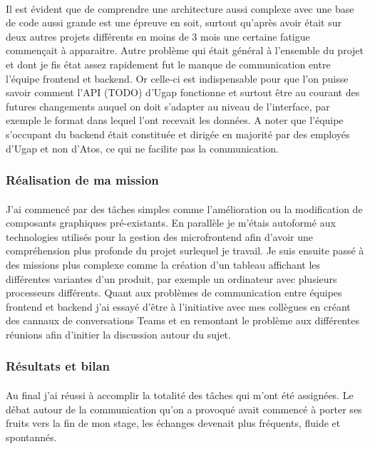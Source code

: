 \documentclass[12pt]{article}
\begin{document}
\begin {sloppypar}
\paragraph{}
Il est évident que de comprendre une architecture aussi complexe avec une base de code aussi grande 
est une épreuve en soit, surtout qu'après avoir était sur deux autres projets différents en moins de 3 mois
une certaine fatigue commençait à apparaitre. Autre problème qui était général à l'ensemble du projet
et dont je fis état assez rapidement fut le manque de communication entre l'équipe frontend et backend. 
Or celle-ci est indispensable pour que l'on puisse savoir comment l'API (TODO) d'Ugap fonctionne et
surtout être au courant des futures changements auquel on doit s'adapter au niveau de l'interface,
par exemple le format dans lequel l'ont recevait les données. A noter que l'équipe s'occupant du 
backend était constituée et dirigée en majorité par des employés d'Ugap et non d'Atos, ce qui ne 
facilite pas la communication.
\subsubsection{Réalisation de ma mission}
\paragraph{}
J'ai commencé par des tâches simples comme l'amélioration ou la modification de composants graphiques
pré-existants. En parallèle je m'étais autoformé aux technologies utilisés pour la gestion des microfrontend 
afin d'avoir une compréhension plus profonde du projet surlequel je travail. Je suis ensuite passé à des missions 
plus complexe comme la création d'un tableau affichant les différentes variantes d'un produit, par exemple
un ordinateur avec plusieurs processeurs différents. Quant aux problèmes de communication entre équipes frontend 
et backend j'ai essayé d'être à l'initiative avec mes collègues en créant des cannaux de conversations Teams 
et en remontant le problème aux différentes réunions afin d'initier la discussion autour du sujet.

\subsubsection{Résultats et bilan}
\paragraph{}
Au final j'ai réussi à accomplir la totalité des tâches qui m'ont été assignées. Le débat autour de la communication 
qu'on a provoqué avait commencé à porter ses fruits vers la fin de mon stage, les échanges devenait plus 
fréquents, fluide et spontannés. 

\end{sloppypar}
\end{document}
